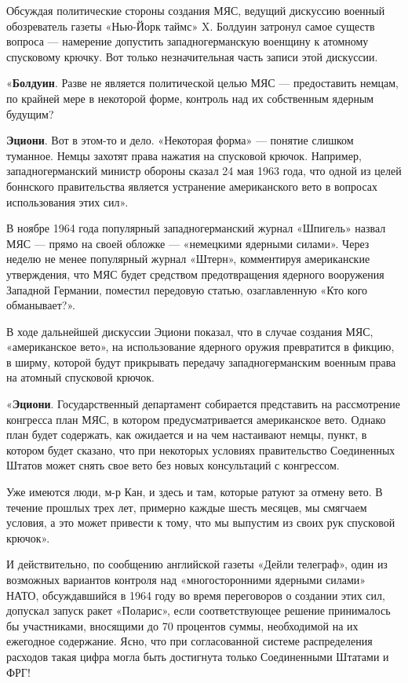 \documentclass[12pt, a4paper, openany]{book}
\begin{document}
Обсуждая политические стороны создания МЯС, ведущий дискуссию военный обозреватель газеты «Нью-Йорк таймс» X. Болдуин затронул самое существ вопроса — намерение допустить западногерманскую военщину к атомному спусковому крючку. Вот только незначительная часть записи этой дискуссии.
	
«\textbf{Болдуин}. Разве не является политической целью МЯС — предоставить немцам, по крайней мере в некоторой форме, контроль над их собственным ядерным будущим?

\textbf{Эциони}. Вот в этом-то и дело. «Некоторая форма» — понятие слишком туманное. Немцы захотят права нажатия на спусковой крючок. Например, западногерманский министр обороны сказал 24 мая 1963 года, что одной из целей боннского правительства является устранение американского вето в вопросах использования этих сил».
	
	
	В ноябре 1964 года популярный западногерманский журнал «Шпигель» назвал МЯС — прямо на своей обложке — «немецкими ядерными силами». Через неделю не менее популярный журнал «Штерн», комментируя американские утверждения, что МЯС будет средством предотвращения ядерного вооружения Западной Германии, поместил передовую статью, озаглавленную «Кто кого обманывает?».
	
	В ходе дальнейшей дискуссии Эциони показал, что в случае создания МЯС, «американское вето», на использование ядерного оружия превратится в фикцию, в ширму, которой будут прикрывать передачу западногерманским военным права на атомный спусковой крючок.
	
	«\textbf{Эциони}. Государственный департамент собирается представить на рассмотрение конгресса план МЯС, в котором предусматривается американское вето. Однако план будет содержать, как ожидается и на чем настаивают немцы, пункт, в котором будет сказано, что при некоторых условиях правительство Соединенных Штатов может снять свое вето без новых консультаций с конгрессом.
	
	Уже имеются люди, м-р Кан, и здесь и там, которые ратуют за отмену вето. В течение прошлых трех лет, примерно каждые шесть месяцев, мы смягчаем условия, а это может привести к тому, что мы выпустим из своих рук спусковой крючок».
	
	И действительно, по сообщению английской газеты «Дейли телеграф», один из возможных вариантов контроля над «многосторонними ядерными силами» НАТО, обсуждавшийся в 1964 году во время переговоров о создании этих сил, допускал запуск ракет «Поларис», если соответствующее решение принималось бы участниками, вносящими до 70 процентов суммы, необходимой на их ежегодное содержание. Ясно, что при согласованной системе распределения расходов такая цифра могла быть достигнута только Соединенными Штатами и ФРГ!
	
\end{document}
